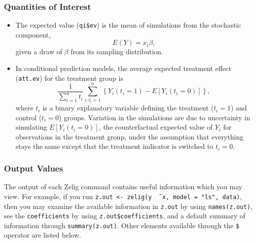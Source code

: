 \subsubsection{Quantities of Interest} 
\begin{itemize}
\item The expected value ({\tt qi\$ev}) is the mean of simulations
  from the stochastic component,  
\begin{equation*}
E(Y) = x_i \beta,\end{equation*}
given a draw of $\beta$ from its sampling distribution.  

\item In conditional prediction models, the average expected treatment
  effect ({\tt att.ev}) for the treatment group is 
    \begin{equation*} \frac{1}{\sum_{i=1}^n t_i}\sum_{i:t_i=1}^n \left\{ Y_i(t_i=1) -
      E[Y_i(t_i=0)] \right\},
    \end{equation*} 
    where $t_i$ is a binary explanatory variable defining the treatment
    ($t_i=1$) and control ($t_i=0$) groups.  Variation in the
    simulations are due to uncertainty in simulating $E[Y_i(t_i=0)]$,
    the counterfactual expected value of $Y_i$ for observations in the
    treatment group, under the assumption that everything stays the
    same except that the treatment indicator is switched to $t_i=0$.

\end{itemize}

\subsubsection{Output Values}

The output of each Zelig command contains useful information which you
may view.  For example, if you run \texttt{z.out <- zelig(y \~\,
  x, model = "ls", data)}, then you may examine the available
information in \texttt{z.out} by using \texttt{names(z.out)},
see the {\tt coefficients} by using {\tt z.out\$coefficients}, and
a default summary of information through \texttt{summary(z.out)}.
Other elements available through the {\tt \$} operator are listed
below.

